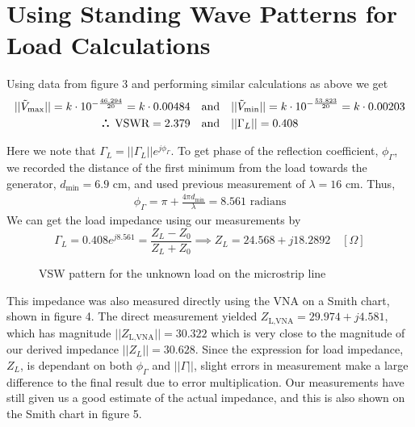 \documentclass[10pt]{article}
\def\therefore{\boldsymbol{\text{ }
\leavevmode
\lower0.4ex\hbox{$\cdot$}
\kern-.5em\raise0.7ex\hbox{$\cdot$}
\kern-0.55em\lower0.4ex\hbox{$\cdot$}
\thinspace\text{ }}}
\begin{document}
\section{Using Standing Wave Patterns for Load Calculations}

\vspace{-0.2cm}
Using data from figure 3 and performing similar calculations as above we get
\begin{align*}
  || \tilde V_\text{max}|| = k\cdot 10^{-\frac{46.294}{20}} = k\cdot 0.00484 \quad &\text{and} \quad || \tilde V_\text{min}|| = k\cdot 10^{-\frac{53.823}{20}} = k\cdot 0.00203\\
  \therefore \text{ VSWR} = 2.379 \quad &\text{and} \quad ||\Gamma_L|| = 0.408 
\end{align*}

Here we note that $\Gamma_L = ||\Gamma_L||e^{j\phi_\Gamma}$. To get phase of the reflection coefficient, $\phi_\Gamma$, we recorded the distance of the first minimum from the load towards the 
generator, $d_\text{min} = 6.9 \text{ cm}$, and used previous measurement of $\lambda = 16\text{ cm}$. Thus,
\begin{align*}
  \phi_\Gamma = \pi + \frac{4\pi d_\text{min}}{\lambda}= 8.561\text{ radians}
\end{align*}
We can get the load impedance using our measurements by 
\[
  \Gamma_L  = 0.408e^{j8.561} = \frac{Z_L - Z_0}{Z_L + Z_0} \implies Z_L = 24.568 + j18.2892 \quad [\Omega]
\]

\begin{figure}[hb]
  \centering
  \caption{VSW pattern for the unknown load on the microstrip line}
  \label{VNA_log_mag_unknown}
\end{figure}

This impedance was also measured directly using the VNA on a Smith chart, shown in figure 4. The direct measurement yielded
$Z_\text{L,VNA} = 29.974 + j4.581$, which has magnitude $||Z_\text{L,VNA}|| = 30.322$ which is very close to the magnitude of our 
derived impedance $||Z_L|| = 30.628$. Since the expression for load impedance, $Z_L$, is dependant on both $\phi_\Gamma$ and $||\Gamma||$, slight 
errors in measurement make a large difference to the final result due to error multiplication. Our measurements have still 
given us a good estimate of the actual impedance, and this is also shown on the Smith chart in figure 5.
\end{document}
